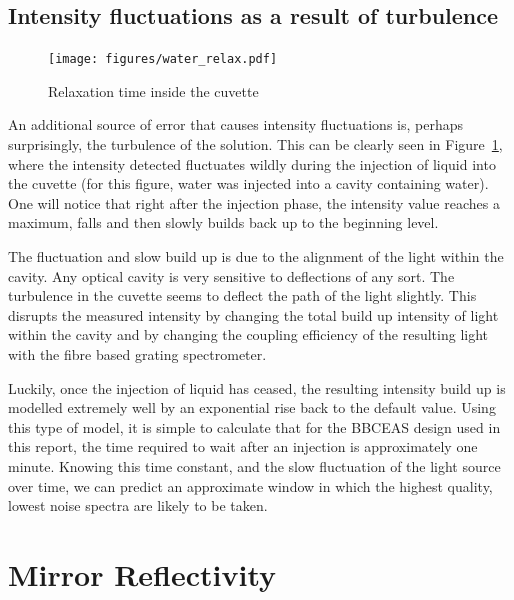 \subsection{Intensity fluctuations as a result of turbulence}

\begin{figure}
\begin{center}
\texttt{[image: figures/water\_relax.pdf]}
\end{center}
\caption{Relaxation time inside the cuvette}
\label{fig:relax}
\end{figure}

An additional source of error that causes intensity fluctuations is, perhaps
surprisingly, the turbulence of the solution. This can be clearly seen in
Figure~\ref{fig:relax}, where the intensity detected fluctuates wildly during
the injection of liquid into the cuvette (for this figure, water was injected
into a cavity containing water). One will notice that right after the injection
phase, the intensity value reaches a maximum, falls and then slowly builds back
up to the beginning level.

The fluctuation and slow build up is due to the alignment of the light within
the cavity. Any optical cavity is very sensitive to deflections of any sort.
The turbulence in the cuvette seems to deflect the path of the light slightly.
This disrupts the measured intensity by changing the total build up intensity
of light within the cavity and by changing the coupling efficiency of the
resulting light with the fibre based grating spectrometer.

Luckily, once the injection of liquid has ceased, the resulting intensity build
up is modelled extremely well by an exponential rise back to the default
value. Using this type of model, it is simple to calculate that for the
\ac{BBCEAS} design used in this report, the time required to wait after an
injection is approximately one minute.
Knowing this time constant, and the slow fluctuation of the light source over
time, we can predict an approximate window in which the highest quality,
lowest noise spectra are likely to be taken.

\section{Mirror Reflectivity}\label{sec:mirror_considerations}

